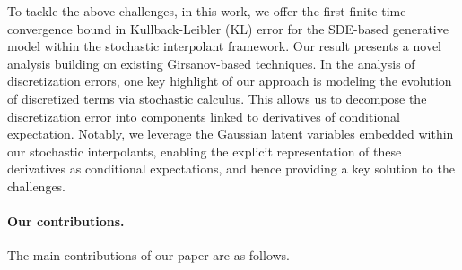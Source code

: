 To tackle the above challenges, in this work, we offer the first finite-time convergence bound in Kullback-Leibler (KL) error for the SDE-based generative model within the stochastic interpolant framework. 
Our result presents a novel analysis building on existing Girsanov-based techniques.
In the analysis of discretization errors, one key highlight of our approach is  modeling the evolution of discretized terms via stochastic calculus. This allows us to decompose the discretization error into components linked to derivatives of conditional expectation. Notably, we leverage the Gaussian latent variables embedded within our stochastic interpolants, enabling the explicit representation of these derivatives as conditional expectations, and hence providing a key solution to the challenges.


\paragraph{Our contributions.} The main contributions of our paper are as follows. 


